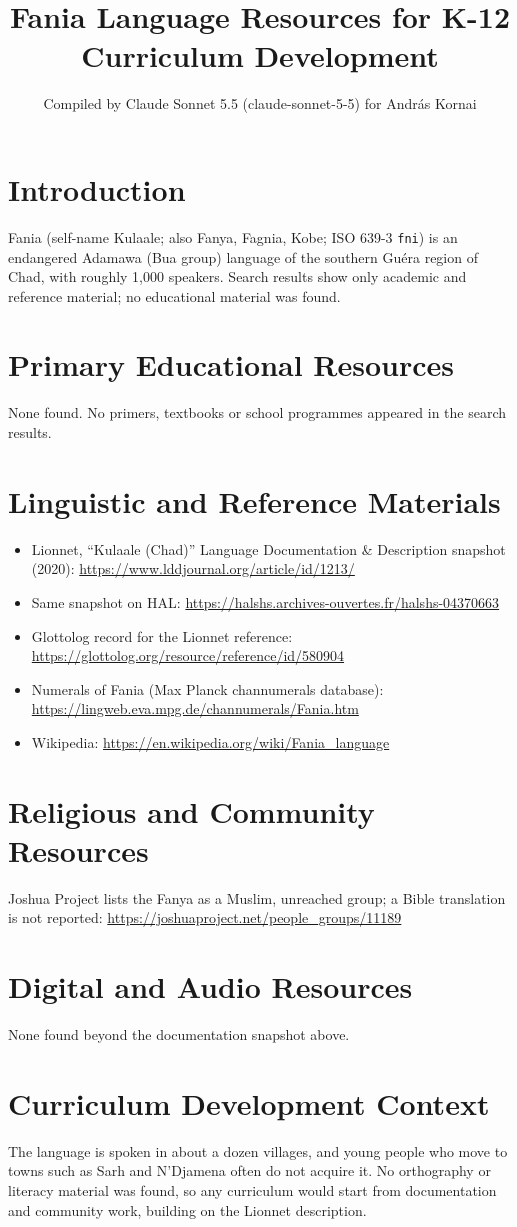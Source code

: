 \documentclass[12pt]{article}
\title{Fania Language Resources for K-12 Curriculum Development}
\author{Compiled by Claude Sonnet 5.5 (claude-sonnet-5-5) for Andr\'as Kornai}
\date{}
\begin{document}
\maketitle

\section{Introduction}
Fania (self-name Kulaale; also Fanya, Fagnia, Kobe; ISO 639-3 \texttt{fni}) is an endangered Adamawa (Bua group) language of the southern Gu\'era region of Chad, with roughly 1,000 speakers. Search results show only academic and reference material; no educational material was found.

\section{Primary Educational Resources}
None found. No primers, textbooks or school programmes appeared in the search results.

\section{Linguistic and Reference Materials}
\begin{itemize}
\item Lionnet, ``Kulaale (Chad)'' Language Documentation \& Description snapshot (2020): \url{https://www.lddjournal.org/article/id/1213/}
\item Same snapshot on HAL: \url{https://halshs.archives-ouvertes.fr/halshs-04370663}
\item Glottolog record for the Lionnet reference: \url{https://glottolog.org/resource/reference/id/580904}
\item Numerals of Fania (Max Planck channumerals database): \url{https://lingweb.eva.mpg.de/channumerals/Fania.htm}
\item Wikipedia: \url{https://en.wikipedia.org/wiki/Fania_language}
\end{itemize}

\section{Religious and Community Resources}
Joshua Project lists the Fanya as a Muslim, unreached group; a Bible translation is not reported: \url{https://joshuaproject.net/people_groups/11189}

\section{Digital and Audio Resources}
None found beyond the documentation snapshot above.

\section{Curriculum Development Context}
The language is spoken in about a dozen villages, and young people who move to towns such as Sarh and N'Djamena often do not acquire it. No orthography or literacy material was found, so any curriculum would start from documentation and community work, building on the Lionnet description.
\end{document}
